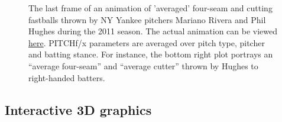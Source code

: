 \begin{article}
\begin{figure}[h]
\caption{\label{fig:animate2}The last frame of an animation of 'averaged'
four-seam and cutting fastballs thrown by NY Yankee pitchers Mariano
Rivera and Phil Hughes during the 2011 season. The actual animation
can be viewed \protect\href{http://cpsievert.github.io/pitchRx/ani2}{here}.
PITCHf/x parameters are averaged over pitch type, pitcher and batting
stance. For instance, the bottom right plot portrays an ``average
four-seam'' and ``average cutter'' thrown by Hughes to right-handed
batters. }
\end{figure}



\subsection{Interactive 3D graphics}


\end{article}
